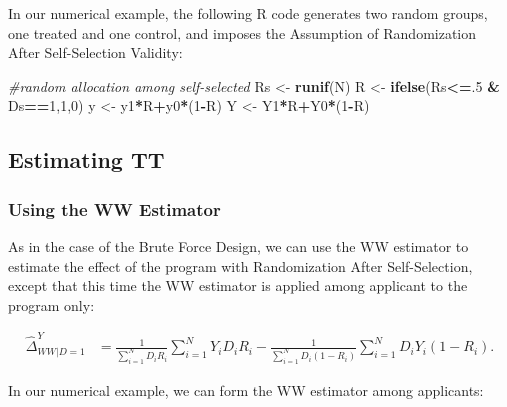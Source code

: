 \documentclass[]{book}
\newenvironment{Shaded}{\begin{snugshade}}{\end{snugshade}}
\newcommand{\KeywordTok}[1]{\textcolor[rgb]{0.13,0.29,0.53}{\textbf{#1}}}
\newcommand{\DecValTok}[1]{\textcolor[rgb]{0.00,0.00,0.81}{#1}}
\newcommand{\StringTok}[1]{\textcolor[rgb]{0.31,0.60,0.02}{#1}}
\newcommand{\CommentTok}[1]{\textcolor[rgb]{0.56,0.35,0.01}{\textit{#1}}}
\newcommand{\OperatorTok}[1]{\textcolor[rgb]{0.81,0.36,0.00}{\textbf{#1}}}
\newcommand{\NormalTok}[1]{#1}
\theoremstyle{definition}
\theoremstyle{definition}
\theoremstyle{definition}
\theoremstyle{remark}
\let\BeginKnitrBlock\begin \let\EndKnitrBlock\end
\begin{document}
\BeginKnitrBlock{example}
\protect\hypertarget{exm:unnamed-chunk-82}{}{\label{exm:unnamed-chunk-82}
}In our numerical example, the following R code generates two random
groups, one treated and one control, and imposes the Assumption of
Randomization After Self-Selection Validity:
\EndKnitrBlock{example}

\begin{Shaded}
\begin{Highlighting}[]
\CommentTok{#random allocation among self-selected}
\NormalTok{Rs <-}\StringTok{ }\KeywordTok{runif}\NormalTok{(N)}
\NormalTok{R <-}\StringTok{ }\KeywordTok{ifelse}\NormalTok{(Rs}\OperatorTok{<=}\NormalTok{.}\DecValTok{5} \OperatorTok{&}\StringTok{ }\NormalTok{Ds}\OperatorTok{==}\DecValTok{1}\NormalTok{,}\DecValTok{1}\NormalTok{,}\DecValTok{0}\NormalTok{)}
\NormalTok{y <-}\StringTok{ }\NormalTok{y1}\OperatorTok{*}\NormalTok{R}\OperatorTok{+}\NormalTok{y0}\OperatorTok{*}\NormalTok{(}\DecValTok{1}\OperatorTok{-}\NormalTok{R)}
\NormalTok{Y <-}\StringTok{ }\NormalTok{Y1}\OperatorTok{*}\NormalTok{R}\OperatorTok{+}\NormalTok{Y0}\OperatorTok{*}\NormalTok{(}\DecValTok{1}\OperatorTok{-}\NormalTok{R)}
\end{Highlighting}
\end{Shaded}

\subsection{Estimating TT}\label{estimating-tt}

\subsubsection{Using the WW Estimator}\label{using-the-ww-estimator-1}

As in the case of the Brute Force Design, we can use the WW estimator to
estimate the effect of the program with Randomization After
Self-Selection, except that this time the WW estimator is applied among
applicant to the program only:

\begin{align*}
  \hat{\Delta}^Y_{WW|D=1} & = \frac{1}{\sum_{i=1}^N D_iR_i}\sum_{i=1}^N Y_iD_iR_i-\frac{1}{\sum_{i=1}^N D_i(1-R_i)}\sum_{i=1}^N D_iY_i(1-R_i).
\end{align*}

\BeginKnitrBlock{example}
\protect\hypertarget{exm:unnamed-chunk-83}{}{\label{exm:unnamed-chunk-83}
}In our numerical example, we can form the WW estimator among
applicants:
\EndKnitrBlock{example}
\end{document}
